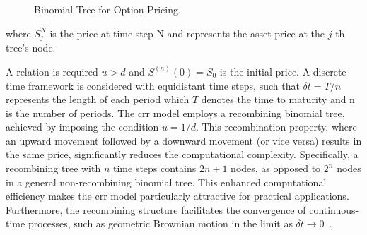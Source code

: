\begin{figure}
        \caption{Binomial Tree for Option Pricing.}
        \label{fig:binomial_tree}
    \end{figure}

    where $S^{N}_{j}$ is the price at time step N and represents the asset price at the $j$-th tree's node.

    A relation is required $u > d$ and $S^{(n)}(0) = S_0$ is the initial price.
    A discrete-time framework is considered with equidistant time steps,
    such that $\delta t = T/n$ represents the length of each period which $T$ denotes the time to maturity
    and n is the number of periods.
    The \gls{crr} model employs a recombining binomial tree,
    achieved by imposing the condition $u = 1/d$.
    This recombination property,
    where an upward movement followed by a downward movement (or vice versa) results in the same price,
    significantly reduces the computational complexity.
    Specifically, a recombining tree with $n$ time steps contains $2n+1$ nodes,
    as opposed to $2^n$ nodes in a general non-recombining binomial tree.
    This enhanced computational efficiency makes the \gls{crr} model particularly attractive for practical applications.
    Furthermore, the recombining structure facilitates the convergence of continuous-time processes,
    such as geometric Brownian motion in the limit as $\delta t \to 0$~\cite{billingsley_convergence_1999}.

